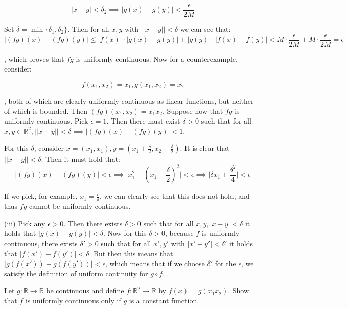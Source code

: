 \begin{solution}
    $$ \lvert x - y \rvert  < \delta_2 \implies  \lvert g(x) - g(y) \rvert < \frac{\epsilon}{2M}$$

    Set $\delta = \min\{\delta_1, \delta_2\}$. Then for all $x, y$ with $\lvert \lvert x - y \rvert \rvert < \delta$ we can see that:
    $$\lvert (fg)(x) - (fg)(y) \rvert \leq \lvert f(x) \rvert \cdot \lvert g(x) - g(y) \rvert + \lvert g(y) \rvert \cdot \lvert f(x) - f(y) \rvert < M\cdot \frac{\epsilon}{2M} + M\cdot \frac{\epsilon}{2M} = \epsilon$$

    , which proves that $fg$ is uniformly continuous. Now for a counterexample, consider:
    
    $$f(x_1, x_2) = x_1, g(x_1, x_2) = x_2$$
    
    , both of which are clearly uniformly continuous as linear functions, but neither of which is bounded. Then $(fg)(x_1, x_2) = x_1x_2$. Suppose now that $fg$ is uniformly continuous. Pick $\epsilon = 1$. Then there must exist $\delta > 0$ such that for all $x, y \in \mathbb{R}^2, \lvert \lvert x - y \rvert \rvert < \delta \implies \lvert (fg)(x) - (fg)(y) \rvert < 1$.

    For this $\delta$, consider $x = (x_1, x_1), y = (x_1 + \frac{\delta}{2}, x_2 + \frac{\delta}{2})$. It is clear that $\lvert \lvert x - y \rvert \rvert < \delta$. Then it must hold that:
    $$ \lvert (fg)(x) - (fg)(y) \rvert < \epsilon \implies \lvert x_1^2 - (x_1+\frac{\delta}{2})^2 \rvert < \epsilon \implies \lvert \delta x_1 + \frac{\delta^2}{4} \rvert < \epsilon$$

    If we pick, for example, $x_1 = \frac{\epsilon}{\delta}$, we can clearly see that this does not hold, and thus $fg$ cannot be uniformly continuous.

    (iii) Pick any $\epsilon > 0$. Then there exists $\delta > 0$ such that for all $x, y, \lvert x - y \rvert < \delta$ it holds that $\lvert g(x) - g(y) \rvert < \delta$. Now for this $\delta > 0$, because $f$ is uniformly continuous, there exists $\delta' > 0 $ such that for all $x', y'$ with $\lvert x' - y' \rvert < \delta'$ it holds that $\lvert f(x') - f(y') \rvert < \delta$. But then this means that $\lvert g(f(x')) - g(f(y')) \rvert < \epsilon$, which means that if we choose $\delta'$ for the $\epsilon$, we satisfy the definition of uniform continuity for $g \circ f$.
\end{solution}

\begin{exercise}{32}
    Let $g: \mathbb{R} \rightarrow \mathbb{R}$ be continuous and define $f: \mathbb{R}^2 \rightarrow \mathbb{R}$ by $f(x) = g(x_1x_2)$. Show that $f$ is uniformly continuous only if $g$ is a constant function.
\end{exercise}

